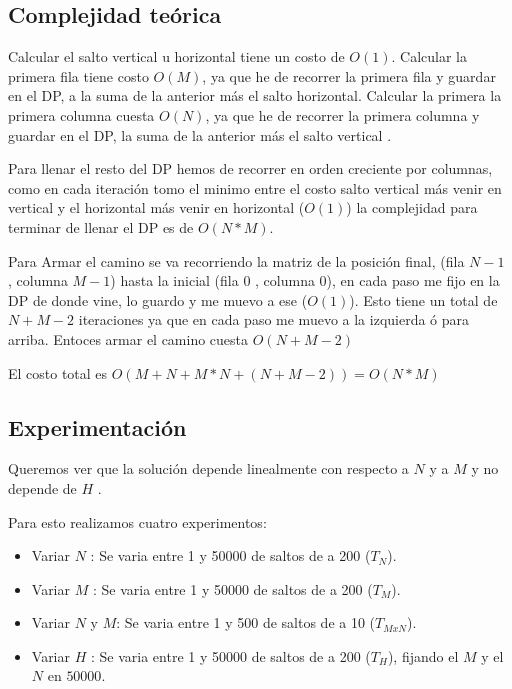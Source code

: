    \subsection{Complejidad teórica}

    Calcular el salto vertical u horizontal tiene un costo de $O(1)$. Calcular la primera fila tiene costo $O(M)$, ya que he de recorrer la primera fila y guardar en el DP, a la suma de la anterior más el salto horizontal. Calcular la primera la primera columna cuesta $O(N)$, ya que he de recorrer la primera columna y guardar en el DP,  la suma de la anterior más el salto vertical .

    Para llenar el resto del DP hemos de recorrer en orden creciente por columnas, como en cada iteración tomo el minimo entre el costo salto vertical más venir en vertical y el horizontal más venir en horizontal ($O(1)$) la complejidad para terminar de llenar el DP es de $O(N*M)$.

    Para Armar el camino se va recorriendo la matriz de la posición final, (fila $N - 1$ , columna $M - 1$) hasta la inicial (fila $0$ , columna $0$), en cada paso me fijo en la DP de donde vine, lo guardo y me muevo a ese ($O(1)$). Esto tiene un total de $N + M - 2$ iteraciones ya que en cada paso me muevo a la izquierda ó para arriba. Entoces armar el camino cuesta $O(N + M - 2)$

    El costo total es $O( M + N + M*N + (N + M − 2) ) = O(N*M)$
     
    \subsection{Experimentación}
    Queremos ver que la solución depende linealmente con respecto a $N$ y a $M$ y no depende de $H$ .

    Para esto realizamos cuatro experimentos:
    \begin{itemize}
        \item Variar $N$ : Se varia entre 1 y 50000 de saltos de a 200 ($T_N$).
        \item Variar $M$ : Se varia entre 1 y 50000 de saltos de a 200 ($T_M$).
        \item Variar $N$ y $M$: Se varia entre 1 y 500 de saltos de a 10 ($T_{MxN}$).
        \item Variar $H$ : Se varia entre 1 y 50000 de saltos de a 200 ($T_H$), fijando el $M$ y el $N$ en $50000$.
    \end{itemize}

